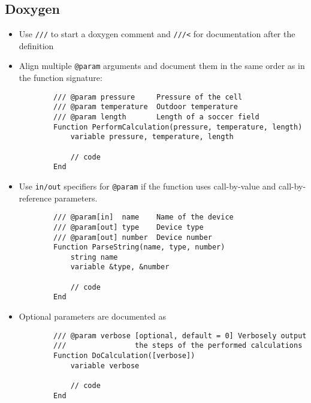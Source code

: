 \documentclass{scrartcl}
\begin{document}
\subsection*{Doxygen}
\begin{itemize}
	\item Use \texttt{///} to start a doxygen comment and \texttt{///<} for documentation after the definition
%
	\item Align multiple \texttt{@param} arguments and document them in the same order as in the function signature:
	\begin{verbatim}
		/// @param pressure     Pressure of the cell
		/// @param temperature  Outdoor temperature
		/// @param length       Length of a soccer field
		Function PerformCalculation(pressure, temperature, length)
			variable pressure, temperature, length

			// code
		End
	\end{verbatim}
%
	\item Use \texttt{in/out} specifiers for \texttt{@param} if the function uses call-by-value and call-by-reference parameters.
	\begin{verbatim}
		/// @param[in]  name    Name of the device
		/// @param[out] type    Device type
		/// @param[out] number  Device number
		Function ParseString(name, type, number)
			string name
			variable &type, &number

			// code
		End
	\end{verbatim}
%
	\item Optional parameters are documented as
	\begin{verbatim}
		/// @param verbose [optional, default = 0] Verbosely output
		///                the steps of the performed calculations
		Function DoCalculation([verbose])
			variable verbose

			// code
		End
	\end{verbatim}
\end{itemize}
%
\end{document}
